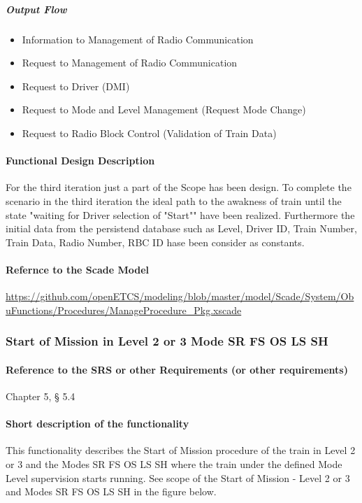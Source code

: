 \subparagraph{Output Flow}
\begin{itemize}
\item Information to Management of Radio Communication
\item Request to Management of Radio Communication
\item Request to Driver (DMI)
\item Request to Mode and Level Management (Request Mode Change)
\item Request to Radio Block Control (Validation of Train Data)
\end{itemize}

\paragraph{Functional Design Description}
For the third iteration just a part of the Scope has been design. To complete the scenario in the third iteration the ideal path to the awakness of train until the state "waiting for Driver selection of "Start"" have been realized. Furthermore the initial data from the persistend database such as Level, Driver ID, Train Number, Train Data, Radio Number, RBC ID hase been consider as constants. 

\paragraph{Refernce to the Scade Model}
\url{https://github.com/openETCS/modeling/blob/master/model/Scade/System/ObuFunctions/Procedures/ManageProcedure_Pkg.xscade}

\subsubsection{Start of Mission in Level 2 or 3 Mode SR FS OS LS SH}

\paragraph{Reference to the SRS or other Requirements (or other requirements)}
Chapter 5, § 5.4

\paragraph{Short description of the functionality}
This functionality describes the Start of Mission procedure of the train in Level 2 or 3 and the Modes SR FS OS LS SH where the train under the defined Mode Level supervision starts running.
See scope of the Start of Mission - Level 2 or 3 and Modes SR FS OS LS SH in the figure below.

